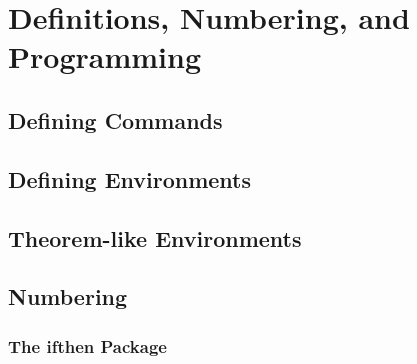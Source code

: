 \section{Definitions, Numbering, and Programming}
\subsection{Defining Commands}


\subsection{Defining Environments}


\subsection{Theorem-like Environments}


\subsection{Numbering}


\subsubsection{The ifthen Package}
